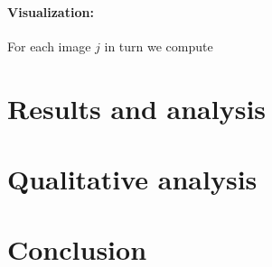 \documentclass[runningheads, table]{llncs}
\begin{document}
  \paragraph{Visualization:}
  For each image $j$ in turn we compute
\section{Results and analysis}
\label{sec:res}

\section{Qualitative analysis}


\section{Conclusion}
\end{document}
